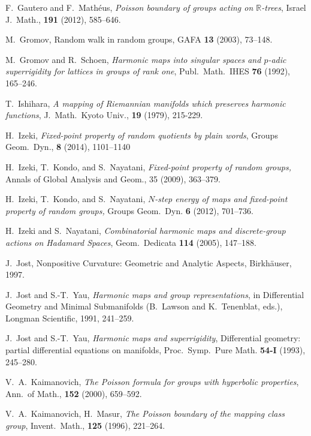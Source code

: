 \documentclass[12pt]{amsart}
\numberwithin{equation}{section}
\theoremstyle{plain}
\theoremstyle{definition}
\theoremstyle{remark}
\newcommand{\R}{{\mathbb R}}
\begin{document}
\begin{thebibliography}{99}
F.~Gautero and F.~Math\'eus, 
 {\it Poisson boundary of groups acting on $\R$-trees}, 
 Israel J.~Math., {\bf 191} (2012), 585--646. 

 M.~Gromov, Random walk in random groups, GAFA 
	 {\bf 13} (2003), 73--148. 


 M.~Gromov and R.~Schoen,
{\it Harmonic maps into singular spaces and $p$-adic superrigidity
for lattices in groups of rank one}, 
Publ.~Math.~IHES {\bf 76} (1992), 165--246.

T.~Ishihara, 
{\it A mapping of Riemannian manifolds which preserves harmonic
functions}, J.~Math.~Kyoto Univ., {\bf 19} (1979), 215-229. 

H.~Izeki, 
{\it Fixed-point property of random quotients by plain words},
Groups Geom.~Dyn., {\bf 8} (2014), 1101--1140

H.~Izeki, T.~Kondo, and S.~Nayatani, 
{\it Fixed-point property of random groups,} 
Annals of Global Analysis and Geom.,  
35 (2009), 363--379. 

H.~Izeki, T.~Kondo, and S.~Nayatani, 
{\it $N$-step energy of maps and fixed-point property of random
     groups,} Groups Geom.~Dyn. {\bf 6} (2012), 701--736. 

H.~Izeki and S.~Nayatani, {\it Combinatorial harmonic maps and
	discrete-group actions on Hadamard Spaces}, Geom.~Dedicata 
	{\bf 114} (2005), 147--188. 

 J.~Jost, 
Nonpositive Curvature: Geometric and Analytic Aspects, Birkh\"auser,
	1997. 

 J.~Jost and S.-T.~Yau,
{\it Harmonic maps and group representations}, in Differential
Geometry and Minimal Submanifolds (B.~Lawson and K.~Tenenblat, eds.),
Longman Scientific, 1991, 241--259.

 J.~Jost and S.-T.~Yau,
{\it Harmonic maps and superrigidity},
Differential geometry: partial differential equations on manifolds,
Proc.~Symp.~Pure Math. {\bf 54-I} (1993), 245--280.

V.~A.~Kaimanovich, {\it The Poisson formula for groups with hyperbolic
	properties}, Ann.~of Math., {\bf 152} (2000), 659--592. 

V.~A.~Kaimanovich, H.~Masur, {\it The Poisson boundary of the mapping
	class group}, Invent.~Math., {\bf 125} (1996), 221--264. 
	

\end{thebibliography}
\end{document}
